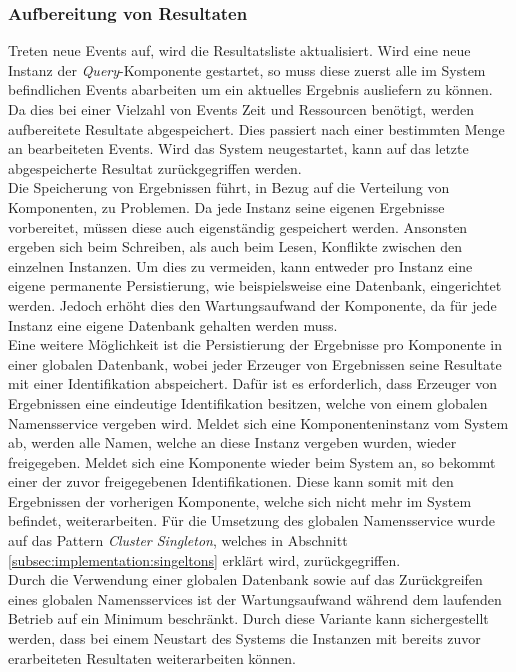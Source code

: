 \subsubsection{Aufbereitung von Resultaten}
\label{subsubsub:implementation:queryActorModel:resultPreparator}
Treten neue Events auf, wird die Resultatsliste aktualisiert. Wird eine neue Instanz der \textit{Query}-Komponente gestartet, so muss diese zuerst alle im System befindlichen Events abarbeiten um ein aktuelles Ergebnis ausliefern zu können. Da dies bei einer Vielzahl von Events Zeit und Ressourcen benötigt, werden aufbereitete Resultate abgespeichert. Dies passiert nach einer bestimmten Menge an bearbeiteten Events. Wird das System neugestartet, kann auf das letzte abgespeicherte Resultat zurückgegriffen werden.\\
Die Speicherung von Ergebnissen führt, in Bezug auf die Verteilung von Komponenten, zu Problemen. Da jede Instanz seine eigenen Ergebnisse vorbereitet, müssen diese auch eigenständig gespeichert werden. Ansonsten ergeben sich beim Schreiben, als auch beim Lesen, Konflikte zwischen den einzelnen Instanzen. Um dies zu vermeiden, kann entweder pro Instanz eine eigene permanente Persistierung, wie beispielsweise eine Datenbank, eingerichtet werden. Jedoch erhöht dies den Wartungsaufwand der Komponente, da für jede Instanz eine eigene Datenbank gehalten werden muss. \\
Eine weitere Möglichkeit ist die Persistierung der Ergebnisse pro Komponente in einer globalen Datenbank, wobei jeder Erzeuger von Ergebnissen seine Resultate mit einer Identifikation abspeichert. Dafür ist es erforderlich, dass Erzeuger von Ergebnissen eine eindeutige Identifikation besitzen, welche von einem globalen Namensservice vergeben wird. Meldet sich eine Komponenteninstanz vom System ab, werden alle Namen, welche an diese Instanz vergeben wurden, wieder freigegeben. Meldet sich eine Komponente wieder beim System an, so bekommt einer der zuvor freigegebenen Identifikationen. Diese kann somit mit den Ergebnissen der vorherigen Komponente, welche sich nicht mehr im System befindet, weiterarbeiten. Für die Umsetzung des globalen Namensservice wurde auf das Pattern \textit{Cluster Singleton}, welches in Abschnitt \ref{subsec:implementation:singeltons} erklärt wird, zurückgegriffen. \\
Durch die Verwendung einer globalen Datenbank sowie auf das Zurückgreifen eines globalen Namensservices ist der Wartungsaufwand während dem laufenden Betrieb auf ein Minimum beschränkt. Durch diese Variante kann sichergestellt werden, dass bei einem Neustart des Systems die Instanzen mit bereits zuvor erarbeiteten Resultaten weiterarbeiten können. 

